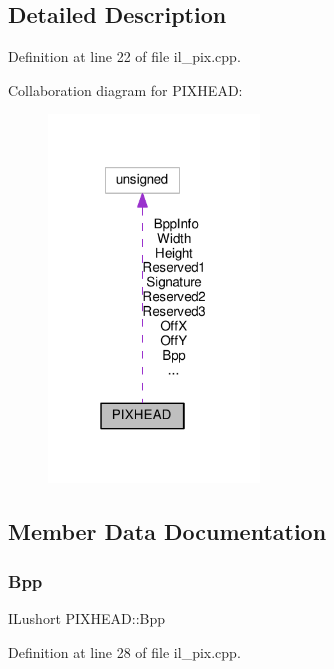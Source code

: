 \subsection{Detailed Description}


Definition at line 22 of file il\+\_\+pix.\+cpp.



Collaboration diagram for P\+I\+X\+H\+E\+AD\+:
\nopagebreak
\begin{figure}[H]
\begin{center}
\leavevmode
\includegraphics[width=159pt]{db/d0b/structPIXHEAD__coll__graph}
\end{center}
\end{figure}


\subsection{Member Data Documentation}
\mbox{\label{structPIXHEAD_ae4b76478f5dc6ceebb2f9e5d1d754eb4}} 
\subsubsection{\texorpdfstring{Bpp}{Bpp}}
{\footnotesize\ttfamily I\+Lushort P\+I\+X\+H\+E\+A\+D\+::\+Bpp}



Definition at line 28 of file il\+\_\+pix.\+cpp.

\mbox{\label{structPIXHEAD_ac8512f6b2facced43e2c0ca2de1ed0f6}} 
